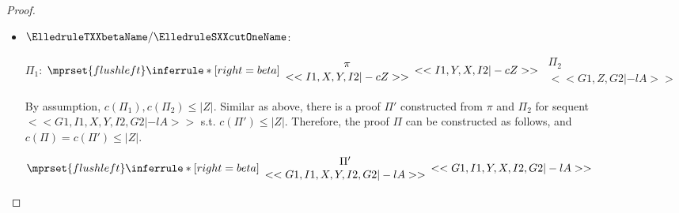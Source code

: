 \begin{proof}
\begin{enumerate}
\begin{itemize}
    \item $\ElledruleTXXbetaName / \ElledruleSXXcutOneName$:
      \begin{center}
        \scriptsize
        $\Pi_1$:
        \begin{math}
          $$\mprset{flushleft}
          \inferrule* [right={\tiny beta}] {
            {
              \begin{array}{c}
                \pi \\
                {<<I1, X, Y, I2 |-c Z>>}
              \end{array}
            }
          }{<<I1, Y, X, I2 |-c Z>>}
        \end{math}
        \qquad\qquad
        \begin{math}
          \begin{array}{c}
            \Pi_2 \\
            {<<G1, Z, G2 |-l A>>}
          \end{array}
        \end{math}
      \end{center}
      By assumption, $c(\Pi_1),c(\Pi_2)\leq |Z|$. Similar as above, there is a proof $\Pi'$
      constructed from $\pi$ and $\Pi_2$ for sequent $<<G1, I1, X, Y, I2, G2 |-l A>>$ s.t.
      $c(\Pi')\leq|Z|$. Therefore, the proof $\Pi$ can be constructed as follows, and
      $c(\Pi)=c(\Pi')\leq|Z|$.
      \begin{center}
        \scriptsize
        \begin{math}
          $$\mprset{flushleft}
          \inferrule* [right={\tiny beta}] {
            {
              \begin{array}{c}
                \Pi' \\
                {<<G1, I1, X, Y, I2, G2 |-l A>>}
              \end{array}
            }
          }{<<G1, I1, Y, X, I2, G2 |-l A>>}
        \end{math}
      \end{center}


\end{itemize}
\end{enumerate}
\end{proof}
